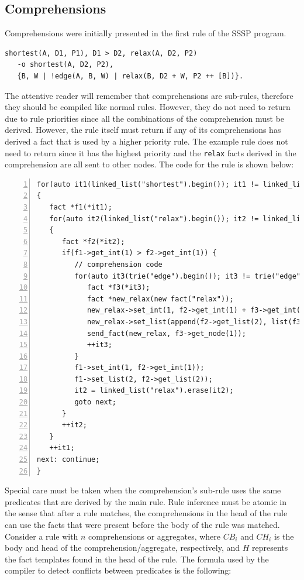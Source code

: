 \subsection{Comprehensions}

Comprehensions were initially presented in the first rule of the SSSP program.

\begin{Verbatim}[fontsize=\codesize]
shortest(A, D1, P1), D1 > D2, relax(A, D2, P2)
   -o shortest(A, D2, P2),
   {B, W | !edge(A, B, W) | relax(B, D2 + W, P2 ++ [B])}.
\end{Verbatim}

The attentive reader will remember that comprehensions are sub-rules, therefore
they should be compiled like normal rules. However, they do not need to return
due to rule priorities since all the combinations of the comprehension must be
derived. However, the rule itself must return if any of its comprehensions
has derived a fact that is used by a higher priority rule.
The example rule does not need to return since it has the highest priority and the
\texttt{relax} facts derived in the comprehension are all sent to other nodes.
The code for the rule is shown below:

\begin{Verbatim}[numbers=left,fontsize=\codesize]
for(auto it1(linked_list("shortest").begin()); it1 != linked_list("shortest").end(); )
{
   fact *f1(*it1);
   for(auto it2(linked_list("relax").begin()); it2 != linked_list("relax").end(); )
   {
      fact *f2(*it2);
      if(f1->get_int(1) > f2->get_int(1)) {
         // comprehension code
         for(auto it3(trie("edge").begin()); it3 != trie("edge").end(); ) {
            fact *f3(*it3);
            fact *new_relax(new fact("relax"));
            new_relax->set_int(1, f2->get_int(1) + f3->get_int(2));
            new_relax->set_list(append(f2->get_list(2), list(f3->get_node(1))));
            send_fact(new_relax, f3->get_node(1));
            ++it3;
         }
         f1->set_int(1, f2->get_int(1));
         f1->set_list(2, f2->get_list(2));
         it2 = linked_list("relax").erase(it2);
         goto next;
      }
      ++it2;
   }
   ++it1;
next: continue;
}
\end{Verbatim}

Special care must be taken when the comprehension's sub-rule uses the same
predicates that are derived by the main rule.
Rule inference must be atomic in the sense that after a rule matches, the
comprehensions in the head of the rule can use the facts that were present
before the body of the rule was matched.
Consider a rule with $n$ comprehensions or aggregates, where $CB_i$ and $CH_i$
is the body and head of the comprehension/aggregate, respectively, and $H$
represents the fact templates found in the head of the rule.
The formula used by the compiler to detect conflicts between predicates is the
following:

